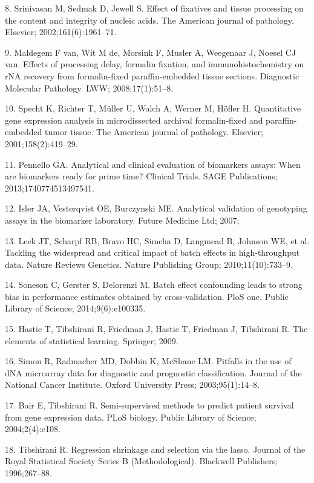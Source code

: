 \documentclass[11pt]{article}
\begin{document}
8. Srinivasan M, Sedmak D, Jewell S. Effect of fixatives and tissue
processing on the content and integrity of nucleic acids. The American
journal of pathology. Elsevier; 2002;161(6):1961--71.

9. Maldegem F van, Wit M de, Morsink F, Musler A, Weegenaar J, Noesel CJ
van. Effects of processing delay, formalin fixation, and
immunohistochemistry on rNA recovery from formalin-fixed
paraffin-embedded tissue sections. Diagnostic Molecular Pathology. LWW;
2008;17(1):51--8.

10. Specht K, Richter T, M{ü}ller U, Walch A, Werner M, H{ö}fler H.
Quantitative gene expression analysis in microdissected archival
formalin-fixed and paraffin-embedded tumor tissue. The American journal
of pathology. Elsevier; 2001;158(2):419--29.

11. Pennello GA. Analytical and clinical evaluation of biomarkers
assays: When are biomarkers ready for prime time? Clinical Trials. SAGE
Publications; 2013;1740774513497541.

12. Isler JA, Vesterqvist OE, Burczynski ME. Analytical validation of
genotyping assays in the biomarker laboratory. Future Medicine Ltd;
2007;

13. Leek JT, Scharpf RB, Bravo HC, Simcha D, Langmead B, Johnson WE, et
al. Tackling the widespread and critical impact of batch effects in
high-throughput data. Nature Reviews Genetics. Nature Publishing Group;
2010;11(10):733--9.

14. Soneson C, Gerster S, Delorenzi M. Batch effect confounding leads to
strong bias in performance estimates obtained by cross-validation. PloS
one. Public Library of Science; 2014;9(6):e100335.

15. Hastie T, Tibshirani R, Friedman J, Hastie T, Friedman J, Tibshirani
R. The elements of statistical learning. Springer; 2009.

16. Simon R, Radmacher MD, Dobbin K, McShane LM. Pitfalls in the use of
dNA microarray data for diagnostic and prognostic classification.
Journal of the National Cancer Institute. Oxford University Press;
2003;95(1):14--8.

17. Bair E, Tibshirani R. Semi-supervised methods to predict patient
survival from gene expression data. PLoS biology. Public Library of
Science; 2004;2(4):e108.

18. Tibshirani R. Regression shrinkage and selection via the lasso.
Journal of the Royal Statistical Society Series B (Methodological).
Blackwell Publishers; 1996;267--88.
\end{document}
